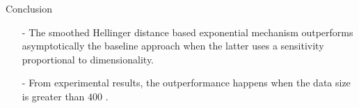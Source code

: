 \documentclass[final,hyperref={pdfpagelabels=false}]{beamer}
\begin{document}
\begin{frame}[t]
\begin{columns}[t]
\begin{column}{.485\textwidth}
\begin{block}{Conclusion}
\begin{itemize}
  \item[-] The smoothed Hellinger distance based exponential mechanism outperforms asymptotically the baseline 
  approach  when the latter uses a sensitivity proportional to dimensionality.
  \item[-] From experimental results, the outperformance happens when the data size is greater than $400$ .
    


\end{itemize}
\end{block}













\end{column}
\end{columns}
\end{frame}
\end{document}
